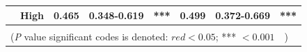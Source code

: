 \documentclass[jpm,article,submit,moreauthors,pdftex]{Definitions/mdpi}
\begin{document}
\begin{table}[!hp]
{\begin{tabular}{|l|l|l|l|l|l|l|l|}
\cline{2-8}
                                        & High                                                                                & 0.465                                                                          & 0.348-0.619                                                                   & \multicolumn{1}{c|}{\textcolor[rgb]{1,0.149,0}{***}}                          & 0.499                                                                          & 0.372-0.669                                                                   & \multicolumn{1}{c|}{\textcolor[rgb]{1,0.149,0}{***}}                           \\ 
\hline
\multicolumn{8}{|l|}{}                                                                                                                                                                                                                                                                                                                                                                                                                                                                                                                                                                                                           \\ 
\hline
\multicolumn{8}{|l|}{(\textit{P} value significant codes is denoted: $red<0.05$; *** $<0.001$~~)}                                                                                                                                                                                                                                                                                                                                                                                                                                                                                                                                           \\
\hline
\end{tabular}
}
\label{table:table4}
\end{table}






\end{document}

